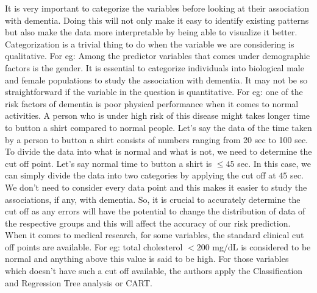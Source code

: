 \documentclass[12pt,letterpaper]{article}
\begin{document}
It is very important to categorize the variables before looking at their association with dementia. Doing this will not only make it easy to identify existing patterns but also make the data more interpretable by being able to visualize it better. Categorization is a trivial thing to do when the variable we are considering is qualitative. For eg: Among the predictor variables that comes under demographic factors is the gender. It is essential to categorize individuals into biological male and female populations to study the association with dementia. It may not be so straightforward if the variable in the question is quantitative. For eg: one of the risk factors of dementia is poor physical performance when it comes to normal activities. A person who is under high risk of this disease might takes longer time to button a shirt compared to normal people.  Let's say the data of the time taken by a person to button a shirt consists of numbers ranging from 20 sec to 100 sec. To divide the data into what is normal and what is not, we need to determine the cut off point. Let's say normal time to button a shirt is $\leq45$ sec. In this case, we can simply divide the data into two categories by applying the cut off at $45$ sec. We don't need to consider every data point and this makes it easier to study the associations, if any, with dementia. So, it is crucial to accurately determine the cut off as any errors will have the potential to change the distribution of data of the respective groups and this will affect the accuracy of our risk prediction. When it comes to medical research, for some variables, the standard clinical cut off points are available. For eg: total cholesterol $<200$ mg/dL is considered to be normal \cite{cholest} and anything above this value is said to be high. For those variables which doesn't have such a cut off available, the authors apply the Classification and Regression Tree analysis or CART.\\
\end{document}
